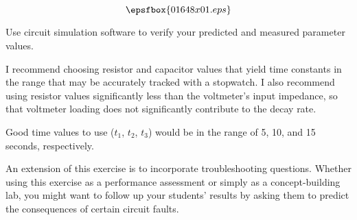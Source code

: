 

$$\epsfbox{01648x01.eps}$$

\vfil \eject






Use circuit simulation software to verify your predicted and measured parameter values.







I recommend choosing resistor and capacitor values that yield time constants in the range that may be accurately tracked with a stopwatch.  I also recommend using resistor values significantly less than the voltmeter's input impedance, so that voltmeter loading does not significantly contribute to the decay rate.

Good time values to use ($t_1$, $t_2$, $t_3$) would be in the range of 5, 10, and 15 seconds, respectively.

An extension of this exercise is to incorporate troubleshooting questions.  Whether using this exercise as a performance assessment or simply as a concept-building lab, you might want to follow up your students' results by asking them to predict the consequences of certain circuit faults.




